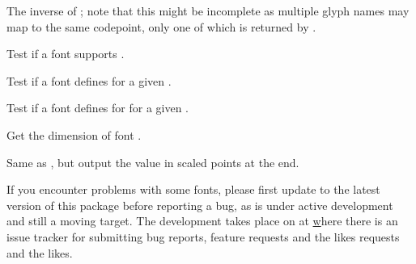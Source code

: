             The inverse of ; note that this
            might be incomplete as multiple glyph names may map to the
            same codepoint, only one of which is returned by
            .

            Test if a font supports .

            Test if a font defines  for a given
            .

            Test if a font defines  for
             for a given .

            Get the dimension  of font .

            Same as , but output the value
            in scaled points at the \TEX end.

\endfunctionlist

\endsubsubsection

% 
% 
% 

\endsubsection
\endsection



If you encounter problems with some fonts, please first update to the
latest version of this package before reporting a bug, as
 is under active development and still a moving
target.
%
The development takes place on  at
\hyperlink {https://github.com/lualatex/luaotfload} where there is an issue
tracker for submitting bug reports, feature requests and the likes
requests and the likes.

